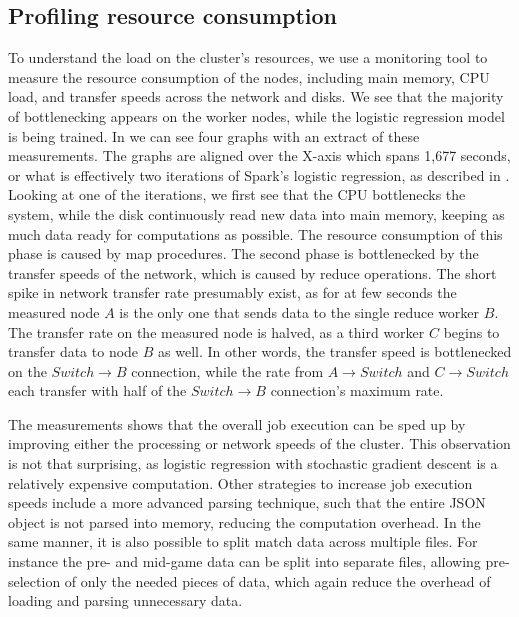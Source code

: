 \subsection{Profiling resource consumption}\label{sec:profile}
To understand the load on the cluster's resources, we use a monitoring tool to measure the resource consumption of the nodes, including main memory, CPU load, and transfer speeds across the network and disks. We see that the majority of bottlenecking appears on the worker nodes, while the logistic regression model is being trained. In 
we can see four graphs with an extract of these measurements. The graphs are aligned over the X-axis which spans 1,677 seconds, or what is effectively two iterations of Spark's logistic regression, as described in . Looking at one of the iterations, we first see that the CPU bottlenecks the system, while the disk continuously read new data into main memory, keeping as much data ready for computations as possible. The resource consumption of this phase is caused by map procedures. The second phase is bottlenecked by the transfer speeds of the network, which is caused by reduce operations. The short spike in network transfer rate presumably exist, as for at few seconds the measured node $A$ is the only one that sends data to the single reduce worker $B$. The transfer rate on the measured node is halved, as a third worker $C$ begins to transfer data to node $B$ as well. In other words, the transfer speed is bottlenecked on the $Switch \rightarrow B$ connection, while the rate from $A \rightarrow Switch$ and $C \rightarrow Switch$ each transfer with half of the $Switch \rightarrow B$ connection's maximum rate.

The measurements shows that the overall job execution can be sped up by improving either the processing or network speeds of the cluster. This observation is not that surprising, as logistic regression with stochastic gradient descent is a relatively expensive computation. Other strategies to increase job execution speeds include a more advanced parsing technique, such that the entire JSON object is not parsed into memory, reducing the computation overhead. In the same manner, it is also possible to split match data across multiple files. For instance the pre- and mid-game data can be split into separate files, allowing pre-selection of only the needed pieces of data, which again reduce the overhead of loading and parsing unnecessary data.

